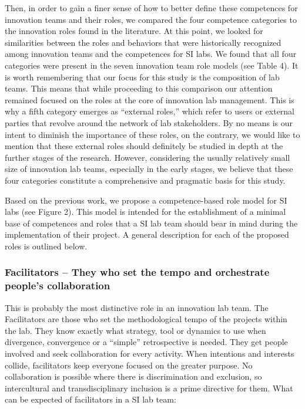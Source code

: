 \documentclass[AMA,STIX1COL,APA,STIX2COL]{WileyNJD-v2}
\begin{document}
Then, in order to gain a finer sense of how to better define these
competences for innovation teams and their roles, we compared the four
competence categories to the innovation roles found in the literature.
At this point, we looked for similarities between the roles and
behaviors that were historically recognized among innovation teams and
the competences for SI labs. We found that all four categories were
present in the seven innovation team role models (see Table 4). It is
worth remembering that our focus for this study is the composition of
lab teams. This means that while proceeding to this comparison our
attention remained focused on the roles at the core of innovation lab
management. This is why a fifth category emerges as ``external roles,''
which refer to users or external parties that revolve around the network
of lab stakeholders. By no means is our intent to diminish the
importance of these roles, on the contrary, we would like to mention
that these external roles should definitely be studied in depth at the
further stages of the research. However, considering the usually
relatively small size of innovation lab teams, especially in the early
stages, we believe that these four categories constitute a comprehensive
and pragmatic basis for this study.

Based on the previous work, we propose a competence-based role model for
SI labs (see Figure 2). This model is intended for the establishment of
a minimal base of competences and roles that a SI lab team should bear
in mind during the implementation of their project. A general
description for each of the proposed roles is outlined below.

\hypertarget{facilitators-they-who-set-the-tempo-and-orchestrate-peoples-collaboration}{%
\subsubsection{Facilitators -- They who set the tempo and orchestrate
people's
collaboration}\label{facilitators-they-who-set-the-tempo-and-orchestrate-peoples-collaboration}}

This is probably the most distinctive role in an innovation lab team.
The Facilitators are those who set the methodological tempo of the
projects within the lab. They know exactly what strategy, tool or
dynamics to use when divergence, convergence or a ``simple''
retrospective is needed. They get people involved and seek collaboration
for every activity. When intentions and interests collide, facilitators
keep everyone focused on the greater purpose. No collaboration is
possible where there is discrimination and exclusion, so intercultural
and transdisciplinary inclusion is a prime directive for them. What can
be expected of facilitators in a SI lab team:
\end{document}
